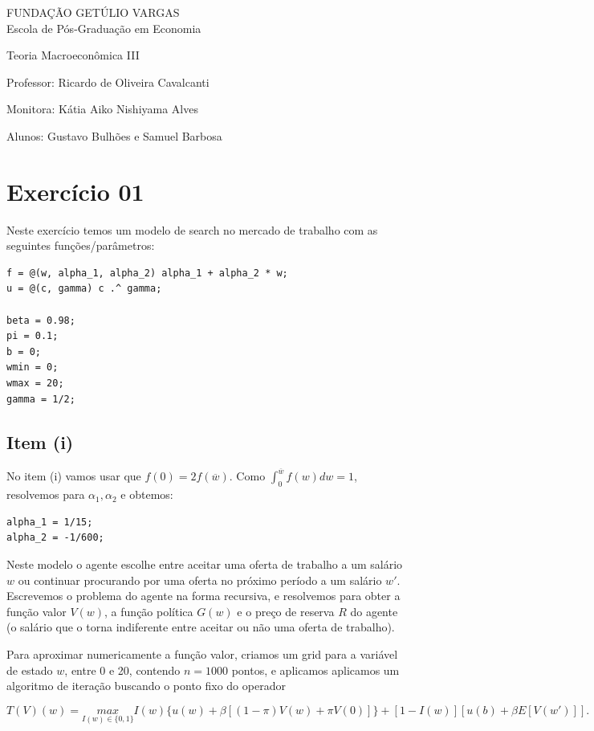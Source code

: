 \documentclass{article}
\begin{document}
\begin{flushleft}
FUNDAÇÃO GETÚLIO VARGAS \\

Escola de Pós-Graduação em Economia

Teoria Macroeconômica III

Professor: Ricardo de Oliveira Cavalcanti

Monitora: Kátia Aiko Nishiyama Alves

Alunos: Gustavo Bulhões e Samuel Barbosa
\end{flushleft}

\section*{Exercício 01}
Neste exercício temos um modelo de search no mercado de trabalho com as seguintes funções/parâmetros:

\begin{lstlisting}
f = @(w, alpha_1, alpha_2) alpha_1 + alpha_2 * w;
u = @(c, gamma) c .^ gamma;

beta = 0.98;
pi = 0.1;
b = 0;
wmin = 0;
wmax = 20;
gamma = 1/2;
\end{lstlisting}

\subsection*{Item (i)}

No item (i) vamos usar que $f(0) = 2f(\overline{w})$. 
Como $\int_{0}^{\overline{w}} f(w) dw = 1$, resolvemos para $\alpha_1, \alpha_2$ e obtemos:

\begin{lstlisting}
alpha_1 = 1/15;
alpha_2 = -1/600;
\end{lstlisting}

Neste modelo o agente escolhe entre aceitar uma oferta de trabalho a um salário $w$ ou 
continuar procurando por uma oferta no próximo período a um salário $w'$. 
Escrevemos o problema do agente na forma recursiva, e resolvemos para obter a função 
valor $V(w)$, a função política $G(w)$ e o preço de reserva $R$ do agente 
(o salário que o torna indiferente entre aceitar ou não uma oferta de trabalho).

Para aproximar numericamente a função valor, criamos um grid para a variável de estado $w$, 
entre 0 e 20, contendo $n = 1000$ pontos, e aplicamos aplicamos um algoritmo de iteração 
buscando o ponto fixo do operador 

$$T(V)(w) = \underset{I(w) \in \{0,1\}}{max} I(w) \{u(w) + \beta [(1-\pi) V(w) + \pi V(0)] \} + [1-I(w)] [u(b) + \beta E[V(w')]].$$
\end{document}
